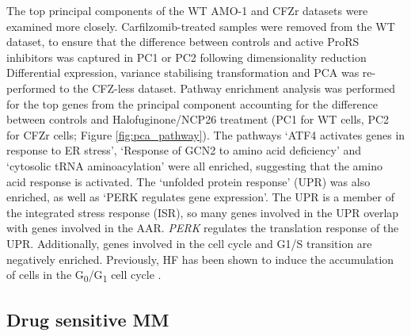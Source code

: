 The top principal components of the WT AMO-1 and CFZr datasets were examined more closely.
Carfilzomib-treated samples were removed from the WT dataset, to ensure that the difference between controls and active ProRS inhibitors was captured in PC1 or PC2 following dimensionality reduction
Differential expression, variance stabilising transformation and PCA was re-performed to the CFZ-less dataset.
Pathway enrichment analysis was performed for the top genes from the principal component accounting for the difference between controls and Halofuginone/NCP26 treatment (PC1 for WT cells, PC2 for CFZr cells; Figure \ref{fig:pca_pathway}).
The pathways `ATF4 activates genes in response to ER stress', `Response of GCN2 to amino acid deficiency' and `cytosolic tRNA aminoacylation' were all enriched, suggesting that the amino acid response is activated.
The `unfolded protein response' (UPR) was also enriched, as well as `PERK regulates gene expression'.
The UPR is a member of the integrated stress response (ISR), so many genes involved in the UPR overlap with genes involved in the AAR\@.
\textit{PERK} regulates the translation response of the UPR\@.
Additionally, genes involved in the cell cycle and G1/S transition are negatively enriched.
Previously, HF has been shown to induce the accumulation of cells in the G\textsubscript{0}/G\textsubscript{1} cell cycle \cite{leiba2012halofuginone}.

\subsection{Drug sensitive MM}

